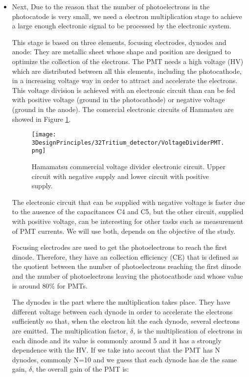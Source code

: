\begin{itemize}
\item{} Next, Due to the reason that the number of photoelectrons in the photocatode is very small, we need a electron multiplication stage to achieve a large enough electronic signal to be processed by the electronic system. 

This stage is based on three elements, focusing electrodes, dynodes and anode: They are metallic sheet whose shape and position are designed to optimize the collection of the electrons. The PMT needs a high voltage (HV) which are distributed between all this elements, including the photocathode, in a increasing voltage way in order to attract and accelerate the electrons. This voltage division is achieved with an electronic circuit than can be fed with positive voltage (ground in the photocathode) or negative voltage (ground in the anode). The comercial electronic circuits of Hammatsu are showed in Figure \ref{fig:VoltageDividerCircuit}.

\begin{figure}[htbp]
\centering
\texttt{[image: 3DesignPrinciples/32Tritium\_detector/VoltageDividerPMT.png]}
\caption{Hamamatsu commercial voltage divider electronic circuit. Upper circuit with negative supply and lower circuit with positive supply.\label{fig:VoltageDividerCircuit}~\cite{DataSheetPMTs}}
\end{figure}

The electronic circuit that can be supplied with negative voltage is faster due to the ausence of the capacitances C4 and C5, but the other circuit, supplied with positive voltage, can be interesting for other tasks such as measurement of PMT currents. We will use both, depends on the objective of the study.

Focusing electrodes are used to get the photoelectrons to reach the first dinode. Therefore, they have an collection efficiency (CE) that is defined as the quotient between the number of photoelectrons reaching the first dinode and the number of photoelectrons leaving the photocathode and whose value is around $80\%$ for PMTs.

The dynodes is the part where the multiplication takes place. They have different voltage between each dynode in order to accelerate the electrons sufficiently so that, when the electron hit the each dynode, several electrons are emitted. The multiplication factor, $\delta$, is the multiplication of electrons in each dinode and its value is commonly around 5 and it has a strongly dependence with the HV. If we take into accout that the PMT has N dynodes, commonly N=10 and we guess that each dynode has de the same gain, $\delta$, the overall gain of the PMT is:


\end{itemize}
